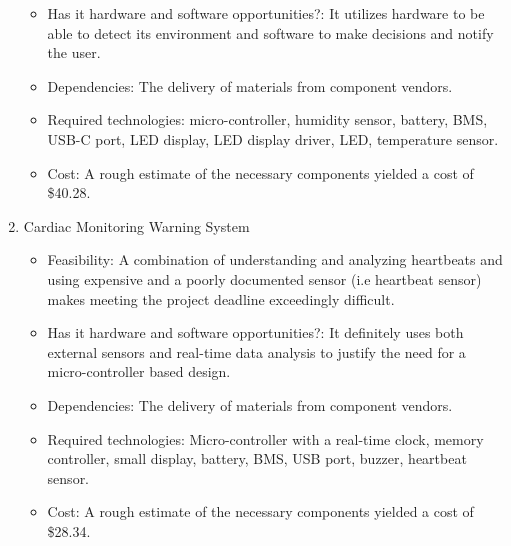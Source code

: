 \begin{enumerate}
\begin{itemize}
          \item Has it hardware and software opportunities?: It utilizes hardware to be able to detect its environment and software to make decisions and notify the user.
          \item Dependencies: The delivery of materials from component vendors.
          \item Required technologies: micro-controller, humidity sensor, battery, BMS, USB-C port, LED display, LED display driver, LED, temperature sensor.
          \item Cost: A rough estimate of the necessary components yielded a cost of \$40.28.
        \end{itemize}
	 \item Cardiac Monitoring Warning System
        \begin{itemize}
          \item Feasibility: A combination of understanding and analyzing heartbeats and using expensive and a poorly documented sensor (i.e heartbeat sensor) makes meeting the project deadline exceedingly difficult.
          \item Has it hardware and software opportunities?: It definitely uses both external sensors and real-time data analysis to justify the need for a micro-controller based design.
          \item Dependencies: The delivery of materials from component vendors.
          \item Required technologies: Micro-controller with a real-time clock, memory controller, small display, battery, BMS, USB port, buzzer, heartbeat sensor.
          \item Cost: A rough estimate of the necessary components yielded a cost of \$28.34.
        \end{itemize}
\end{enumerate}

